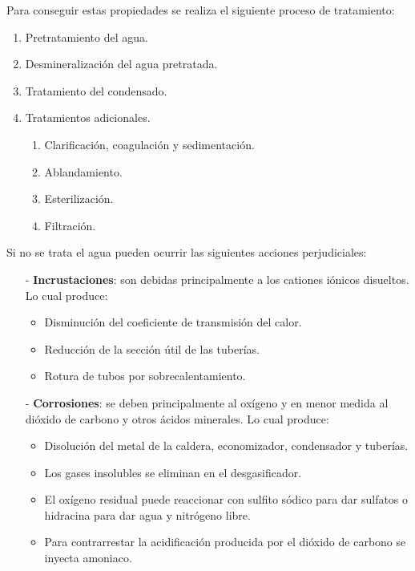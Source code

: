 Para conseguir estas propiedades se realiza el siguiente proceso de tratamiento:
\begin{enumerate}
	\item Pretratamiento del agua.
	\item Desmineralización del agua pretratada.
	\item Tratamiento del condensado.
	\item Tratamientos adicionales.
	\begin{enumerate}
		\item Clarificación, coagulación y sedimentación.
		\item Ablandamiento.
		\item Esterilización.
		\item Filtración.
	\end{enumerate}
\end{enumerate}




Si no se trata el agua pueden ocurrir las siguientes acciones perjudiciales:
\begin{itemize}
	\item [-] \textbf{Incrustaciones}: son debidas principalmente a los cationes iónicos disueltos. Lo cual produce:
	\begin{itemize}
		\item Disminución del coeficiente de transmisión del calor.
		\item Reducción de la sección útil de las tuberías.
		\item Rotura de tubos por sobrecalentamiento.
	\end{itemize}
	\item [-] \textbf{Corrosiones}: se deben principalmente al oxígeno y en menor medida al dióxido de carbono y otros ácidos minerales. Lo cual produce:
	\begin{itemize}
		\item Disolución del metal de la caldera, economizador, condensador y tuberías.
		\item Los gases insolubles se eliminan en el desgasificador.
		\item El oxígeno residual puede reaccionar con sulfito sódico para dar sulfatos o hidracina para dar agua y nitrógeno libre.
		\item Para contrarrestar la acidificación producida por el dióxido de carbono se inyecta amoniaco. 
	\end{itemize}
\end{itemize}
